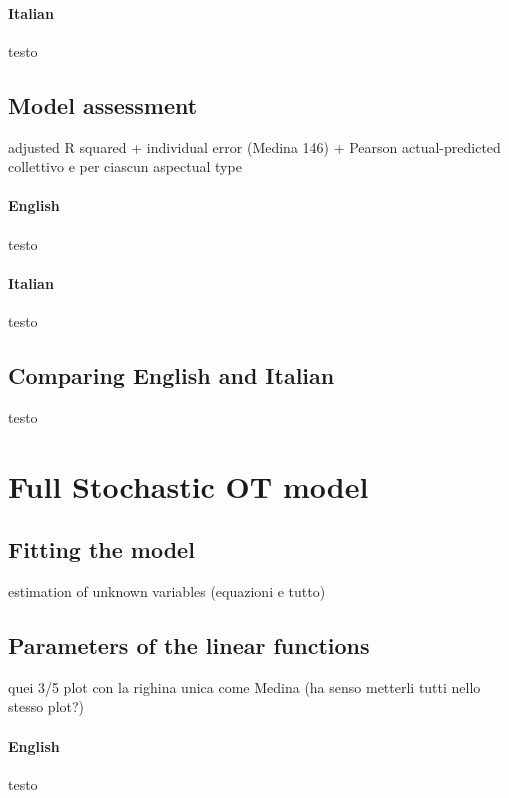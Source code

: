 \paragraph{Italian} testo


\subsection{Model assessment} 

adjusted R squared + 
individual error (Medina 146) +
Pearson actual-predicted collettivo e per ciascun aspectual type

\paragraph{English} testo

\paragraph{Italian} testo


\subsection{Comparing English and Italian} 

testo



\section{Full Stochastic OT model} 


\subsection{Fitting the model} 

estimation of unknown variables (equazioni e tutto)


\subsection{Parameters of the linear functions} 

quei 3/5 plot con la righina unica come Medina (ha senso metterli tutti nello stesso plot?)

\paragraph{English} testo

